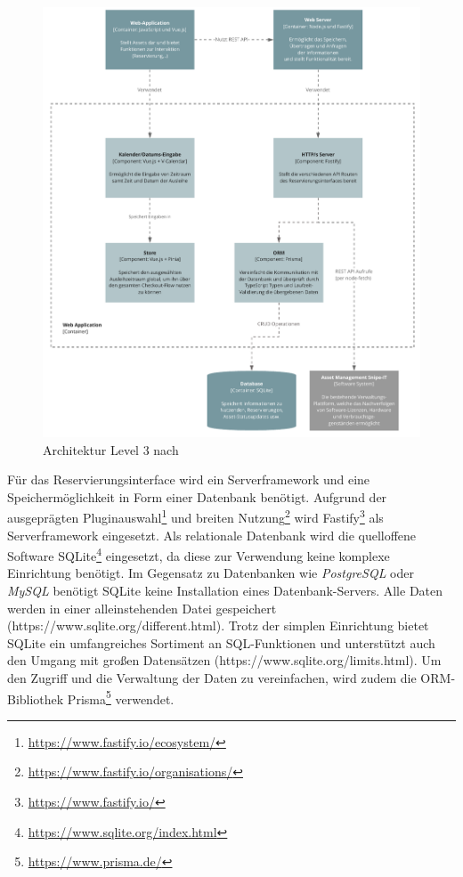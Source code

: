 \begin{figure}[h]
    \centering
    \includegraphics[scale=0.9]{Bilder/C4_3.pdf}
    \caption[Architektur Level 3]{Architektur Level 3 nach
        }
    \label{fig:level3}
\end{figure}

Für das Reservierungsinterface wird ein Serverframework und eine
Speichermöglichkeit in Form einer Datenbank benötigt. Aufgrund der ausgeprägten
Pluginauswahl\footnote{\url{https://www.fastify.io/ecosystem/}} und breiten
Nutzung\footnote{\url{https://www.fastify.io/organisations/}} wird
Fastify\footnote{\url{https://www.fastify.io/}} als Serverframework eingesetzt.
Als relationale Datenbank wird die quelloffene Software
SQLite\footnote{\url{https://www.sqlite.org/index.html}} eingesetzt, da diese
zur Verwendung keine komplexe Einrichtung benötigt. Im Gegensatz zu Datenbanken
wie \textit{PostgreSQL} oder \textit{MySQL} benötigt SQLite keine Installation
eines Datenbank-Servers. Alle Daten werden in einer alleinstehenden Datei
gespeichert (https://www.sqlite.org/different.html). Trotz der simplen
Einrichtung bietet SQLite ein umfangreiches Sortiment an SQL-Funktionen und
unterstützt auch den Umgang mit großen Datensätzen
(https://www.sqlite.org/limits.html). Um den Zugriff und die Verwaltung der
Daten zu vereinfachen, wird zudem die ORM-Bibliothek
Prisma\footnote{\url{https://www.prisma.de/}} verwendet.

